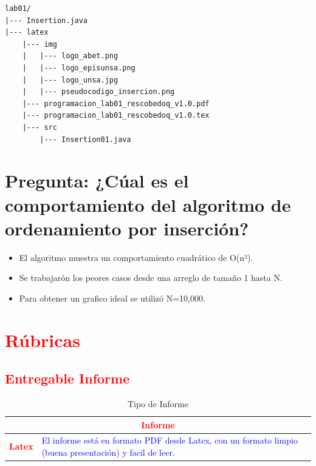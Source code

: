 \documentclass{article}
\begin{document}
\begin{lstlisting}[style=ascii-tree]
lab01/
|--- Insertion.java
|--- latex
    |--- img
    |   |--- logo_abet.png
    |   |--- logo_episunsa.png
    |   |--- logo_unsa.jpg
    |   |--- pseudocodigo_insercion.png    
    |--- programacion_lab01_rescobedoq_v1.0.pdf    
    |--- programacion_lab01_rescobedoq_v1.0.tex
    |--- src
        |--- Insertion01.java
\end{lstlisting}    

\section{Pregunta: ¿Cúal es el comportamiento del algoritmo de ordenamiento por inserción?}
	\begin{itemize}
		\item El algoritmo muestra un comportamiento cuadrático de O(n²).
		\item Se trabajarón los peores casos desde una arreglo de tamaño 1 hasta N.
		\item Para obtener un grafico ideal se utilizó N=10,000.
	\end{itemize}		

	\section{\textcolor{red}{Rúbricas}}
	
	\subsection{\textcolor{red}{Entregable Informe}}
	\begin{table}[H]
		\caption{Tipo de Informe}
		\setlength{\tabcolsep}{0.5em} %
		{\renewcommand{\arraystretch}{1.5}%
		\begin{tabular}{|p{3cm}|p{12cm}|}
			\hline
			\multicolumn{2}{|c|}{\textbf{\textcolor{red}{Informe}}}  \\
			\hline 
			\textbf{\textcolor{red}{Latex}} & \textcolor{blue}{El informe está en formato PDF desde Latex,  con un formato limpio (buena presentación) y facil de leer.}   \\ 
			\hline 
			
			
		\end{tabular}
	}
	\end{table}
	
	\clearpage
	
\end{document}
